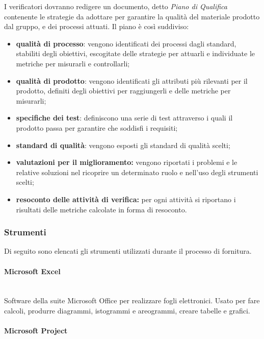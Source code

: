 \noindent I verificatori dovranno redigere un documento, detto \textit{Piano di 
Qualifica} contenente le strategie da adottare per garantire la qualità del 
materiale prodotto dal gruppo, e dei processi attuati. Il piano è così 
suddiviso:
	\begin{itemize}
		\item \textbf{qualità di processo}: vengono identificati dei processi dagli 
			standard, stabiliti degli obiettivi, escogitate delle strategie per attuarli e 			
			individuate le metriche per misurarli e controllarli;
		\item \textbf{qualità di prodotto}: vengono identificati gli attributi più 
			rilevanti per il prodotto, definiti degli obiettivi per raggiungerli e delle 
			metriche per misurarli;
		\item \textbf{specifiche dei test}: definiscono una serie di test attraverso 
			i quali il prodotto passa per garantire che soddisfi i requisiti;
		\item \textbf{standard di qualità}: vengono esposti gli standard di qualità 
			scelti;
		\item \textbf{valutazioni per il miglioramento:} vengono riportati i problemi 
			e le relative soluzioni nel ricoprire un determinato ruolo e nell'uso degli 
			strumenti scelti;
		\item \textbf{resoconto delle attività di verifica:} per ogni attività si 
			riportano i risultati delle metriche calcolate in forma di resoconto.
	\end{itemize}
		
\subsubsection{Strumenti}
Di seguito sono elencati gli strumenti utilizzati durante il processo di 
fornitura.

\paragraph{Microsoft Excel} \mbox{}\\ 

\noindent Software della suite Microsoft Office per realizzare fogli elettronici. Usato 
per fare calcoli, produrre diagrammi, istogrammi e areogrammi, creare tabelle e 
grafici.
		
\paragraph{Microsoft Project} \mbox{}\\ 

